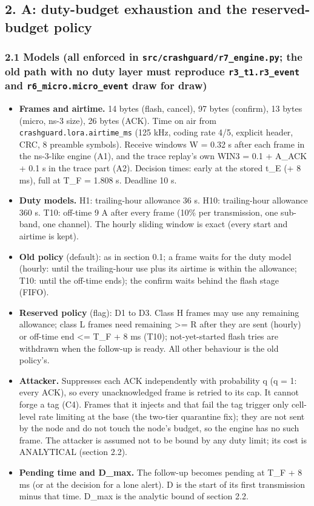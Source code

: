 \subsection*{2. A: duty-budget exhaustion and the reserved-budget policy}

\subsubsection*{2.1 Models (all enforced in \texttt{src/crashguard/r7\_engine.py}; the old path with no duty layer must reproduce \texttt{r3\_t1.r3\_event} and \texttt{r6\_micro.micro\_event} draw for draw)}

\begin{itemize}
\item \textbf{Frames and airtime.} 14 bytes (flash, cancel), 97 bytes (confirm), 13 bytes (micro, ns-3 size), 26 bytes (ACK). Time on air from \texttt{crashguard.lora.airtime\_ms} (125 kHz, coding rate 4/5, explicit header, CRC, 8 preamble symbols). Receive windows W = 0.32 s after each frame in the ns-3-like engine (A1), and the trace replay's own WIN3 = 0.1 + A\_ACK + 0.1 s in the trace part (A2). Decision times: early at the stored t\_E (+ 8 ms), full at T\_F = 1.808 s. Deadline 10 s.
\item \textbf{Duty models.} H1: trailing-hour allowance 36 s. H10: trailing-hour allowance 360 s. T10: off-time 9 A after every frame (10\% per transmission, one sub-band, one channel). The hourly sliding window is exact (every start and airtime is kept).
\item \textbf{Old policy} (default): as in section 0.1; a frame waits for the duty model (hourly: until the trailing-hour use plus its airtime is within the allowance; T10: until the off-time ends); the confirm waits behind the flash stage (FIFO).
\item \textbf{Reserved policy} (flag): D1 to D3. Class H frames may use any remaining allowance; class L frames need remaining >= R after they are sent (hourly) or off-time end <= T\_F + 8 ms (T10); not-yet-started flash tries are withdrawn when the follow-up is ready. All other behaviour is the old policy's.
\item \textbf{Attacker.} Suppresses each ACK independently with probability q (q = 1: every ACK), so every unacknowledged frame is retried to its cap. It cannot forge a tag (C4). Frames that it injects and that fail the tag trigger only cell-level rate limiting at the base (the two-tier quarantine fix); they are not sent by the node and do not touch the node's budget, so the engine has no such frame. The attacker is assumed not to be bound by any duty limit; its cost is ANALYTICAL (section 2.2).
\item \textbf{Pending time and D\_max.} The follow-up becomes pending at T\_F + 8 ms (or at the decision for a lone alert). D is the start of its first transmission minus that time. D\_max is the analytic bound of section 2.2.
\end{itemize}

